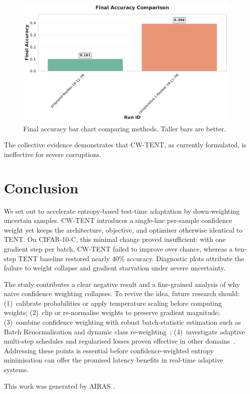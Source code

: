 \documentclass{article} %
\begin{document}
\begin{figure}[H]
  \centering
  \includegraphics[width=0.7\linewidth]{images/final_accuracy_comparison.pdf}
  \caption{Final accuracy bar chart comparing methods. Taller bars are better.}
\end{figure}

The collective evidence demonstrates that CW-TENT, as currently formulated, is ineffective for severe corruptions.

\section{Conclusion}%
\label{sec:conclusion}%
We set out to accelerate entropy-based test-time adaptation by down-weighting uncertain samples. CW-TENT introduces a single-line per-sample confidence weight yet keeps the architecture, objective, and optimiser otherwise identical to TENT\@. On CIFAR-10-C, this minimal change proved insufficient: with one gradient step per batch, CW-TENT failed to improve over chance, whereas a ten-step TENT baseline restored nearly 40\% accuracy. Diagnostic plots attribute the failure to weight collapse and gradient starvation under severe uncertainty.

The study contributes a clear negative result and a fine-grained analysis of why naive confidence weighting collapses. To revive the idea, future research should: (1)~calibrate probabilities or apply temperature scaling before computing weights; (2)~clip or re-normalise weights to preserve gradient magnitude; (3)~combine confidence weighting with robust batch-statistic estimation such as Batch Renormalisation and dynamic class re-weighting~\cite{zhao-2023-delta}; (4)~investigate adaptive multi-step schedules and regularised losses proven effective in other domains~\cite{author-year-test}. Addressing these points is essential before confidence-weighted entropy minimisation can offer the promised latency benefits in real-time adaptive systems.

This work was generated by \textsc{AIRAS} \citep{airas2025}.



\end{document}

